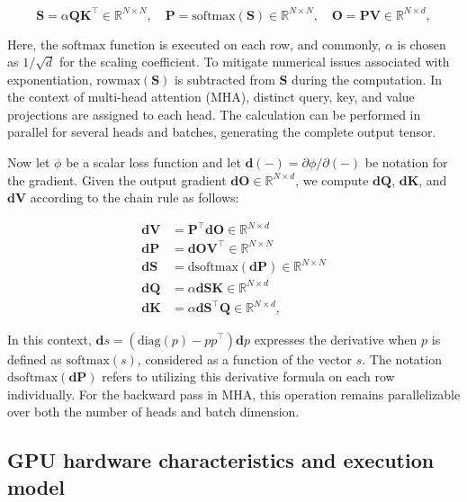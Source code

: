 \begin{equation*}
  \mathbf{S} = \alpha \mathbf{Q} \mathbf{K}^\top \in \mathbb{R}^{N \times N}, \quad \mathbf{P} = \mathrm{softmax}(\mathbf{S}) \in \mathbb{R}^{N \times N}, \quad \mathbf{O} = \mathbf{P}\mathbf{V} \in \mathbb{R}^{N \times d},
\end{equation*}

Here, the $\mathrm{softmax}$ function is executed on each row, and commonly, $\alpha$ is chosen as $1/\sqrt{d}$ for the scaling coefficient. To mitigate numerical issues associated with exponentiation, $\mathrm{rowmax}(\mathbf{S})$ is subtracted from $\mathbf{S}$ during the computation. In the context of multi-head attention (MHA), distinct query, key, and value projections are assigned to each head. The calculation can be performed in parallel for several heads and batches, generating the complete output tensor.

Now let $\phi$ be a scalar loss function and let $\mathbf{d}(-) = \partial \phi / \partial (-)$ be notation for the gradient. Given the output gradient $\mathbf{dO} \in \mathbb{R}^{N \times d}$, we compute $\mathbf{dQ}$, $\mathbf{dK}$, and $\mathbf{dV}$ according to the chain rule as follows:

\begin{align*}
  \mathbf{dV} &= \mathbf{P}^\top \mathbf{dO} \in \mathbb{R}^{N \times d} \\
  \mathbf{dP} &= \mathbf{dO} \mathbf{V}^\top \in \mathbb{R}^{N \times N} \\
  \mathbf{dS} &= \mathrm{dsoftmax} (\mathbf{dP}) \in \mathbb{R}^{N \times N} \\
  \mathbf{dQ} &= \alpha \mathbf{dS} \mathbf{K} \in \mathbb{R}^{N \times d} \\
  \mathbf{dK} &= \alpha \mathbf{dS}^\top \mathbf{Q} \in \mathbb{R}^{N \times d},
\end{align*}

In this context, $\mathbf{d}s = (\mathrm{diag}(p) - p p^\top)\mathbf{d}p$ expresses the derivative when $p$ is defined as $\mathrm{softmax}(s)$, considered as a function of the vector $s$. The notation $\mathrm{dsoftmax}(\mathbf{dP})$ refers to utilizing this derivative formula on each row individually. For the backward pass in MHA, this operation remains parallelizable over both the number of heads and batch dimension.

\subsection{GPU hardware characteristics and execution model}
\label{subsec:hardware}

